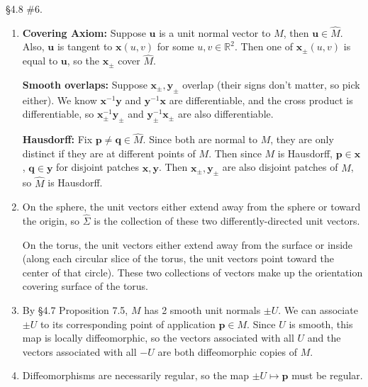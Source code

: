 \documentclass[10pt]{report}
\begin{document}

\renewcommand{\theenumi}{\alph{enumi}}

\begin{exer}[]
\S 4.8 \#6.
\end{exer}
\begin{enumerate}
	\item \textbf{Covering Axiom:} Suppose $\mathbf{u}$ is a unit normal vector to $M$, then $\mathbf{u} \in \hat{M}$. Also, $\mathbf{u}$ is tangent to $\mathbf{x}(u,v)$ for some $u,v \in \mathbb{R}^2$. Then one of $\mathbf{x}_{\pm}(u,v)$ is equal to $\mathbf{u}$, so the $\mathbf{x}_{\pm}$ cover $\hat{M}$.

		\textbf{Smooth overlaps:} Suppose $\mathbf{x}_{\pm}, \mathbf{y}_{\pm}$ overlap (their signs don't matter, so pick either). We know $\mathbf{x}^{-1}\mathbf{y}$ and $\mathbf{y}^{-1}\mathbf{x}$ are differentiable, and the cross product is differentiable, so $\mathbf{x}_{\pm}^{-1}\mathbf{y}_{\pm}$ and $\mathbf{y}_{\pm}^{-1}\mathbf{x}_{\pm}$ are also differentiable.

		\textbf{Hausdorff:} Fix $\mathbf{p} \neq \mathbf{q} \in \hat{M}$. Since both are normal to $M$, they are only distinct if they are at different points of $M$. Then since $M$ is Hausdorff, $\mathbf{p} \in \mathbf{x}$, $\mathbf{q} \in \mathbf{y}$ for disjoint patches $\mathbf{x}, \mathbf{y}$. Then $\mathbf{x}_{\pm}, \mathbf{y}_{\pm}$ are also disjoint patches of $\hat{M}$, so $\hat{M}$ is Hausdorff.

	\item On the sphere, the unit vectors either extend away from the sphere or toward the origin, so $\hat{\Sigma}$ is the collection of these two differently-directed unit vectors.

		On the torus, the unit vectors either extend away from the surface or inside (along each circular slice of the torus, the unit vectors point toward the center of that circle). These two collections of vectors make up the orientation covering surface of the torus.

	\item By \S 4.7 Proposition 7.5, $M$ has 2 smooth unit normals $\pm U$. We can associate $\pm U$ to its corresponding point of application $\mathbf{p} \in M$. Since $U$ is smooth, this map is locally diffeomorphic, so the vectors associated with all $U$ and the vectors associated with all $-U$ are both diffeomorphic copies of $M$.

	\item Diffeomorphisms are necessarily regular, so the map $\pm U \mapsto \mathbf{p}$ must be regular.
\end{enumerate}
\end{document}
